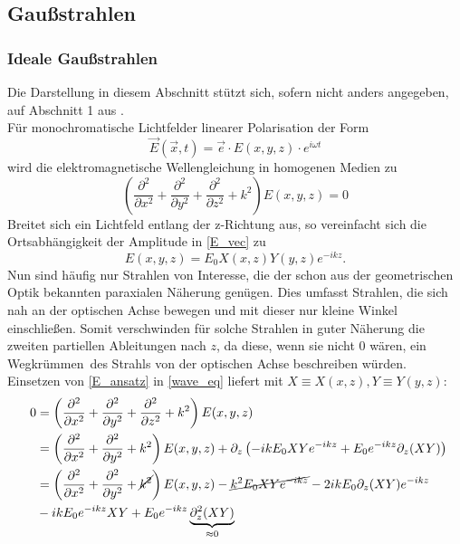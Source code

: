 \documentclass[11pt,a4paper,oneside]{scrartcl}
\begin{document}
\subsection{Gaußstrahlen}
\subsubsection{Ideale Gaußstrahlen}
Die Darstellung in diesem Abschnitt stützt sich, sofern nicht anders angegeben, auf Abschnitt 1 aus \cite{versuchsanleitung}. \\
Für monochromatische Lichtfelder linearer Polarisation der Form 
\begin{equation}\label{E_vec}
\vec E(\vec x,t)=\vec e\cdot E(x,y,z)\cdot e^{i\omega t}
\end{equation}
wird die elektromagnetische Wellengleichung in homogenen Medien zu
\begin{equation}\label{wave_eq}
\left(\frac{\partial^2}{\partial x^2}+\frac{\partial^2}{\partial y^2}+\frac{\partial^2}{\partial z^2}+k^2\right)E(x,y,z)=0
\end{equation}
Breitet sich ein Lichtfeld entlang der z-Richtung aus, so vereinfacht sich die Ortsabhängigkeit der Amplitude in \ref{E_vec} zu 
\begin{equation}\label{E_ansatz}
E(x,y,z)=E_0X(x,z)Y(y,z)e^{-ikz}.
\end{equation}
Nun sind häufig nur Strahlen von Interesse, die der schon aus der geometrischen Optik bekannten paraxialen Näherung genügen. Dies umfasst Strahlen, die sich nah an der optischen Achse bewegen und mit dieser nur kleine Winkel einschließen. Somit verschwinden für solche Strahlen in guter Näherung die zweiten partiellen Ableitungen nach $z$, da diese, wenn sie nicht $0$ wären, ein \glqq Wegkrümmen\grqq\ des Strahls von der optischen Achse beschreiben würden.\\
Einsetzen von \ref{E_ansatz} in \ref{wave_eq} liefert mit $X\equiv X(x,z), Y\equiv Y(y,z)$:
\begin{align}
0&=\left(\frac{\partial^2}{\partial x^2}+\frac{\partial^2}{\partial y^2}+\frac{\partial^2}{\partial z^2}+k^2\right)E(x,y,z) \\ \quad&
=\left(\frac{\partial^2}{\partial x^2}+\frac{\partial^2}{\partial y^2}+k^2\right)E(x,y,z)+\partial_z\left(-ikE_0XYe^{-ikz}+E_0e^{-ikz}\partial_z(XY)\right) \\ \quad&
=\left(\frac{\partial^2}{\partial x^2}+\frac{\partial^2}{\partial y^2}+\cancel{k^2}\right)E(x,y,z)-\cancel{k^2E_0XYe^{-ikz}}-2ikE_0\partial_z(XY)e^{-ikz}\\ \quad& -ikE_0e^{-ikz}XY+E_0e^{-ikz}\underbrace{\partial_z^2(XY)}_{\approx 0}
\end{align}
\end{document}
